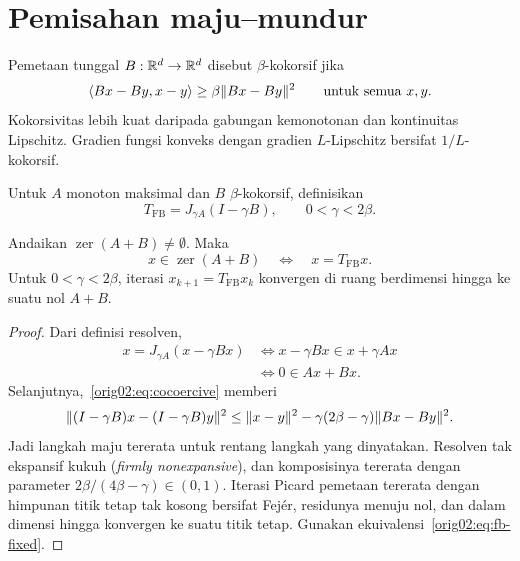 \section{Pemisahan maju--mundur}
\label{orig02:section:forward-backward}

Pemetaan tunggal $B:\mathbb{R}^d\to\mathbb{R}^d$ disebut $\beta$-kokorsif jika
\begin{equation}
  \label{orig02:eq:cocoercive}
  \left\langle Bx-By , x-y\right\rangle\geq\beta\|Bx-By\|^2
  \qquad\text{untuk semua }x,y.
\end{equation}
Kokorsivitas lebih kuat daripada gabungan kemonotonan dan kontinuitas
Lipschitz. Gradien fungsi konveks dengan gradien $L$-Lipschitz bersifat
$1/L$-kokorsif.

Untuk $A$ monoton maksimal dan $B$ $\beta$-kokorsif, definisikan
\begin{equation}
  \label{orig02:eq:fb-operator}
  T_{\mathrm{FB}}=J_{\gamma A}(I-\gamma B),
  \qquad 0<\gamma<2\beta.
\end{equation}

\begin{theorem}
  \label{orig02:theorem:fb}
  Andaikan $\operatorname{zer}(A+B)\neq\emptyset$. Maka
  \begin{equation}
    \label{orig02:eq:fb-fixed}
    x\in\operatorname{zer}(A+B)
    \quad\Longleftrightarrow\quad x=T_{\mathrm{FB}}x.
  \end{equation}
  Untuk $0<\gamma<2\beta$, iterasi $x_{k+1}=T_{\mathrm{FB}}x_k$ konvergen di
  ruang berdimensi hingga ke suatu nol $A+B$.
\end{theorem}
\begin{proof}
  Dari definisi resolven,
  \begin{equation}
  \begin{aligned}
    x=J_{\gamma A}(x-\gamma Bx)
    &\Longleftrightarrow x-\gamma Bx\in x+\gamma Ax\\
    &\Longleftrightarrow 0\in Ax+Bx.
  \end{aligned}
  \end{equation}
  Selanjutnya,~\eqref{orig02:eq:cocoercive} memberi
  \begin{equation}
    \|(I-\gamma B)x-(I-\gamma B)y\|^2
    \leq\|x-y\|^2
      -\gamma(2\beta-\gamma)\|Bx-By\|^2.
  \end{equation}
  Jadi langkah maju tererata untuk rentang langkah yang dinyatakan. Resolven
  tak ekspansif kukuh (\emph{firmly nonexpansive}), dan komposisinya tererata dengan parameter
  $2\beta/(4\beta-\gamma)\in(0,1)$. Iterasi Picard pemetaan tererata dengan
  himpunan titik tetap tak kosong bersifat Fej\'er, residunya menuju nol, dan
  dalam dimensi hingga konvergen ke suatu titik tetap. Gunakan
  ekuivalensi~\eqref{orig02:eq:fb-fixed}.
\end{proof}

